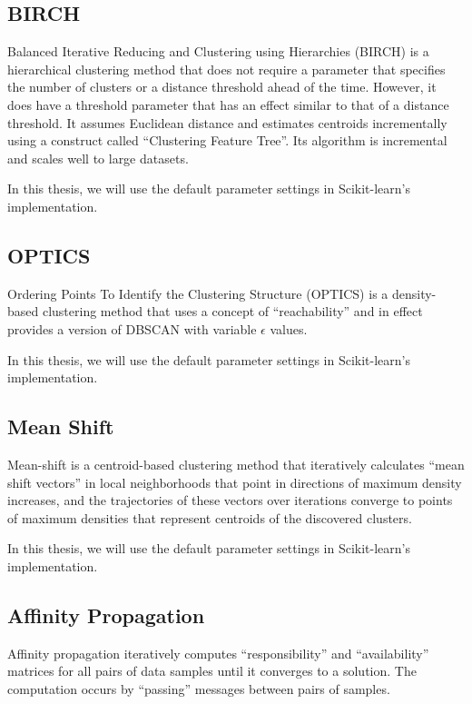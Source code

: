 \subsection{BIRCH}

Balanced Iterative Reducing and Clustering using Hierarchies (BIRCH) \cite{zhang_birch_1996} is a hierarchical clustering method that does not require a parameter that specifies the number of clusters or a distance threshold ahead of the time. However, it does have a threshold parameter that has an effect similar to that of a distance threshold. It assumes Euclidean distance and estimates centroids incrementally using a construct called ``Clustering Feature Tree''. Its algorithm is incremental and scales well to large datasets.

In this thesis, we will use the default parameter settings in Scikit-learn's implementation.

\subsection{OPTICS}

Ordering Points To Identify the Clustering Structure (OPTICS) \cite{ankerst_optics_1999} is a density-based clustering method that uses a concept of ``reachability'' and in effect provides a version of DBSCAN with variable $\epsilon$ values.

In this thesis, we will use the default parameter settings in Scikit-learn's implementation.

\subsection{Mean Shift}

Mean-shift \cite{comaniciu_mean_2002} is a centroid-based clustering method that iteratively calculates ``mean shift vectors'' in local neighborhoods that point in directions of maximum density increases, and the trajectories of these vectors over iterations converge to points of maximum densities that represent centroids of the discovered clusters.

In this thesis, we will use the default parameter settings in Scikit-learn's implementation.

\subsection{Affinity Propagation}

Affinity propagation \cite{frey_clustering_2007} iteratively computes ``responsibility'' and ``availability'' matrices for all pairs of data samples until it converges to a solution. The computation occurs by ``passing'' messages between pairs of samples.

